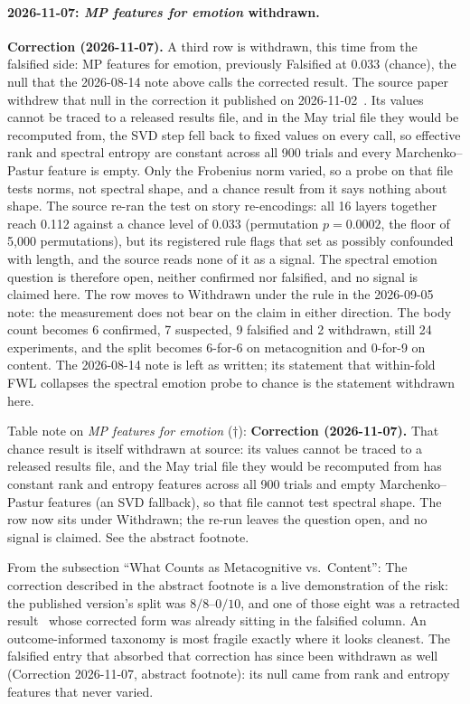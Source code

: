 \documentclass[11pt,a4paper]{article}
\begin{document}
\paragraph{2026-11-07: \emph{MP features for emotion} withdrawn.}
\textbf{Correction (2026-11-07).} A third row is withdrawn, this time from the
falsified side: MP features for emotion, previously Falsified at 0.033
(chance), the null that the 2026-08-14 note above calls the corrected result.
The source paper withdrew that null in the correction it published on
2026-11-02~\citep{lyra2026usermodel}. Its values cannot be traced to a
released results file, and in the May trial file they would be recomputed
from, the SVD step fell back to fixed values on every call, so effective rank
and spectral entropy are constant across all 900 trials and every
Marchenko--Pastur feature is empty. Only the Frobenius norm varied, so a probe
on that file tests norms, not spectral shape, and a chance result from it says
nothing about shape. The source re-ran the test on story re-encodings: all 16 layers together
reach 0.112 against a chance level of 0.033 (permutation $p = 0.0002$, the
floor of 5{,}000 permutations), but its registered rule flags that set as
possibly confounded with length, and the source reads none of it as a signal.
The spectral emotion question is therefore open, neither confirmed nor
falsified, and no signal is claimed here. The row moves to Withdrawn under the
rule in the 2026-09-05 note: the measurement does not bear on the claim in
either direction. The body count becomes 6 confirmed, 7 suspected, 9 falsified
and 2 withdrawn, still 24 experiments, and the split becomes 6-for-6 on
metacognition and 0-for-9 on content. The 2026-08-14 note is left as written;
its statement that within-fold FWL collapses the spectral emotion probe to
chance is the statement withdrawn here.

Table note on \emph{MP features for emotion} ($\dagger$):
\textbf{Correction (2026-11-07).} That chance result is itself withdrawn at
source: its values cannot be traced to a released results file, and the May
trial file they would be recomputed from has constant rank and entropy
features across all 900 trials and empty Marchenko--Pastur features (an SVD
fallback), so that file cannot test spectral shape. The row now sits under
Withdrawn; the re-run leaves the question open, and no signal is claimed. See
the abstract footnote.

From the subsection ``What Counts as Metacognitive vs.\ Content'': The correction described in the abstract footnote is a live
demonstration of the risk: the published version's split was
$8/8$--$0/10$, and one of those eight was a retracted result~\citep{lyra2026usermodel} whose
corrected form was already sitting in the falsified column. An
outcome-informed taxonomy is most fragile exactly where it looks
cleanest. The falsified entry that absorbed that correction has since been
withdrawn as well (Correction 2026-11-07, abstract footnote): its null came
from rank and entropy features that never varied.
\end{document}
